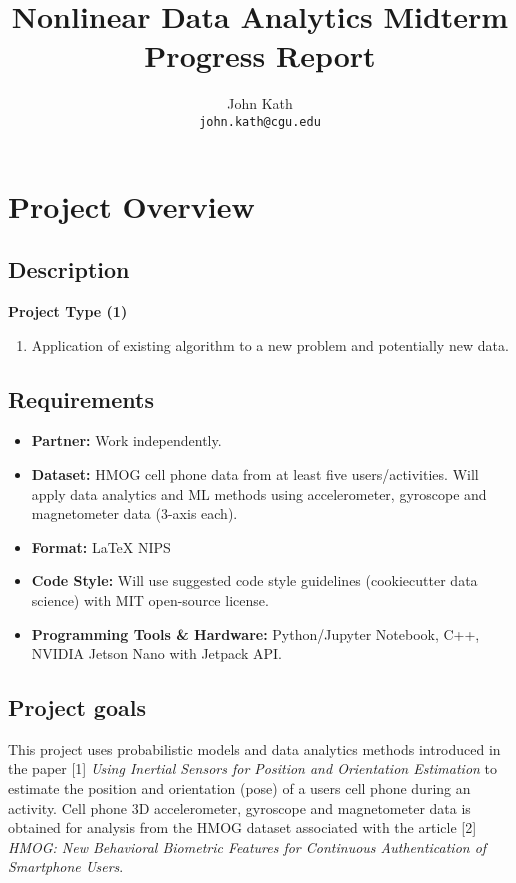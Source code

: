 \documentclass{article}
\title{Nonlinear Data Analytics Midterm Progress Report}
\author{
  John Kath \\
  \texttt{john.kath@cgu.edu} \\
}
\begin{document}
\maketitle

\tableofcontents


\section{Project Overview}

\subsection{Description}

\textbf{Project Type (1)}

\begin{enumerate}
  \item Application of existing algorithm to a new problem and
    potentially new data.
\end{enumerate}

\subsection{Requirements}

\begin{itemize}
  \item \textbf{Partner:} Work independently.
  \item \textbf{Dataset:} HMOG cell phone data from at least five
    users/activities. Will apply data analytics and ML methods using
    accelerometer, gyroscope and magnetometer data (3-axis each).
  \item \textbf{Format:} \LaTeX{} NIPS
  \item \textbf{Code Style:} Will use suggested code style guidelines
    (cookiecutter data science) with MIT open-source license.
  \item \textbf{Programming Tools \& Hardware:} Python/Jupyter
    Notebook, C++, NVIDIA Jetson Nano with Jetpack API.
\end{itemize}

\subsection{Project goals}

This project uses probabilistic models and data analytics methods
introduced in the paper [1] \textit{Using Inertial Sensors for Position
and Orientation Estimation} to estimate the position and orientation
(pose) of a users cell phone during an activity. Cell phone 3D
accelerometer, gyroscope and magnetometer data is obtained for
analysis from the HMOG dataset associated with the article [2]
\textit{HMOG: New Behavioral Biometric Features for Continuous
Authentication of Smartphone Users}.
\end{document}
